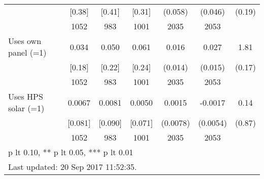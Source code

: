 \begin{table}[htbp]
\begin{tabular*}{1\hsize}{@{\hskip\tabcolsep\extracolsep\fill}l*{1}{cccccc}}
                                &   [0.38]&   [0.41]&   [0.31]&  (0.058)         &  (0.046)         &   (0.19)         \\
                                &     1052&      983&     1001&     2035         &     2053         &                  \\
\hspace{5mm} Uses own panel (=1)             &    0.034&    0.050&    0.061&    0.016         &    0.027\sym{*}  &     1.81         \\
                                &   [0.18]&   [0.22]&   [0.24]&  (0.014)         &  (0.015)         &   (0.17)         \\
                                &     1052&      983&     1001&     2035         &     2053         &                  \\
\hspace{5mm} Uses HPS solar (=1)             &   0.0067&   0.0081&   0.0050&   0.0015         &  -0.0017         &     0.14         \\
                                &  [0.081]&  [0.090]&  [0.071]& (0.0078)         & (0.0054)         &   (0.87)         \\
                                &     1052&      983&     1001&     2035         &     2053         &                  \\
\bottomrule
\multicolumn{7}{l}{\footnotesize * p lt 0.10, ** p lt 0.05, *** p lt 0.01}\\
\multicolumn{7}{l}{\footnotesize Last updated: 20 Sep 2017 11:52:35.}\\
\end{tabular*}
\end{table}
